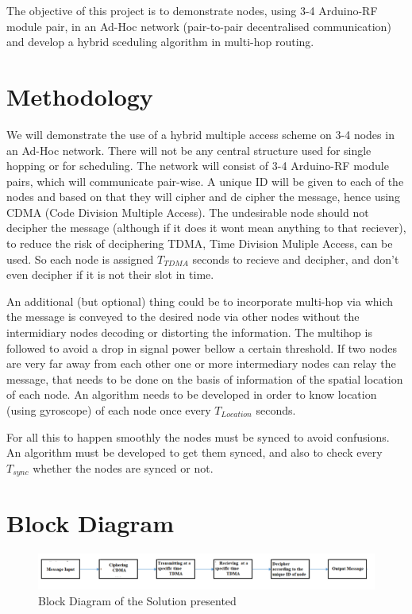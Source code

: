 \documentclass[12pt]{article}
\begin{document}
 The objective of this project is to demonstrate nodes, using 3-4 Arduino-RF module pair, in an Ad-Hoc network (pair-to-pair decentralised communication) and develop a hybrid sceduling algorithm in multi-hop routing.
 
 \section{Methodology}
 
We will demonstrate the use of a hybrid multiple access scheme on 3-4 nodes in an Ad-Hoc network. There will not be any central structure used for single hopping or for scheduling. The network will consist of 3-4 Arduino-RF module pairs, which will communicate pair-wise. A unique ID will be given to each of the nodes and based on that they will cipher and de	cipher the message, hence using CDMA (Code Division Multiple Access). The undesirable node should not decipher the message (although if it does it wont mean anything to that reciever), to reduce the risk of deciphering TDMA, Time Division Muliple Access, can be used. So each node is assigned $T_{TDMA}$ seconds to recieve and decipher, and don't even decipher if it is not their slot in time. 

An additional (but optional) thing could be to incorporate multi-hop via which the message is conveyed to the desired node via other nodes without the intermidiary nodes decoding or distorting the information. The multihop is followed to avoid a drop in signal power bellow a certain threshold. If two nodes are very far away from each other one or more intermediary nodes can relay the message, that needs to be done on the basis of information of the spatial location of each node. An algorithm needs to be developed in order to know location (using gyroscope) of each node once every $T_{Location}$ seconds. 

For all this to happen smoothly the nodes must be synced to avoid confusions. An algorithm must be developed to get them synced, and also to check every $T_{sync}$ whether the nodes are synced or not. 

 
 \section{Block Diagram}
 
 \begin{figure}[h]
 \centering
 \includegraphics[scale = 0.59]{BlockDiagam.png}
 \caption{Block Diagram of the Solution presented}
 \end{figure}
 
\end{document}
